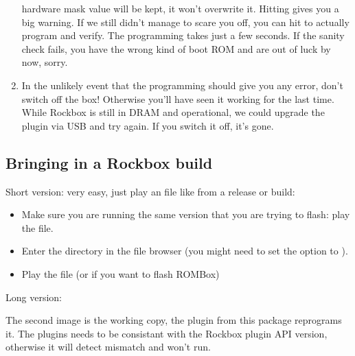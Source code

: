 \begin{enumerate}
  hardware mask value will be kept, it won't overwrite it. Hitting  gives you 
  a big warning. If we still didn't manage to scare you off, you can hit to actually program and verify. The programming takes just a few seconds. If 
  the sanity check fails, you have the wrong kind of boot ROM and are out of luck
  by now, sorry.
\item In the unlikely event that the programming should give you any error, don't
  switch off the box! Otherwise you'll have seen it working for the last time. 
  While Rockbox is still in DRAM and operational, we could upgrade the plugin via
  USB and try again. If you switch it off, it's gone.
\end{enumerate}



\subsection{Bringing in a Rockbox build}
Short version: very easy, just play an  file like 
 from a release or build:

\begin{itemize}
\item Make sure you are running the same version that you are trying to flash: 
  play the  file.
\item  Enter the  directory in the file browser (you might need 
  to set the  option to ).
\item Play the  file (or  if you want to 
  flash ROMBox)
\end{itemize}

Long version:

The second image is the working copy, the  plugin from
this package reprograms it. The plugins needs to be consistant with the Rockbox 
plugin API version, otherwise it will detect mismatch and won't run.

